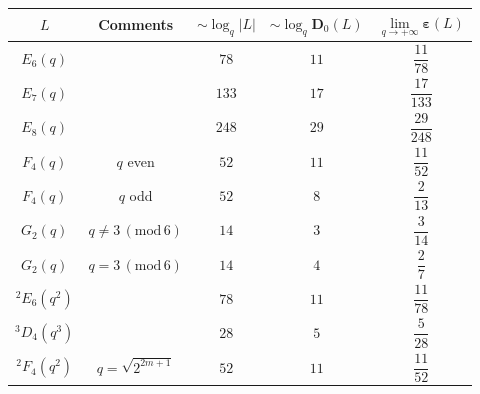 \documentclass{daj}
\theoremstyle{definition}
\theoremstyle{remark}
\newcommand{\D}{\mathbf{D}}
\renewcommand{\a}{\boldsymbol{\varepsilon}}
\begin{document}
{\begin{table}[ht]
\begin{tabular}{| c c | c c c |}
		\phantom{$\dfrac{1^1}{1_{1_1}}$}\hspace{-6mm}
		$L$ & Comments  & $\sim \log_q|L|$ & $\sim \log_q \D_0(L)$ & $\lim \limits_{q \rightarrow+\infty} \a(L)$ \\
		
		\hline \hline
		
		\phantom{$\dfrac{1^1}{1_{1_1}}$}\hspace{-6mm}
		$E_6(q)$ & & $78$ & $11$ & $\dfrac{11}{78}$ \\
		
		\phantom{$\dfrac{1^1}{1_{1_1}}$}\hspace{-6mm}
		$E_7(q)$ & & $133$ & $17$ & $\dfrac{17}{133}$  \\
		
		\phantom{$\dfrac{c1^1}{1_{1_1}}$}\hspace{-6mm}
		$E_8(q)$ & & $248$ & $29$ & $\dfrac{29}{248}$  \\
		
		\phantom{$\dfrac{1^1}{1_{1_1}}$}\hspace{-6mm}
		$F_4(q)$ & $q$ even & $52$ & $11$ & $\dfrac{11}{52}$ \\
		
		\phantom{$\dfrac{1^1}{1_{1_1}}$}\hspace{-6mm}
		$F_4(q)$ & $q$ odd & $52$ & $8$ & $\dfrac{2}{13}$ \\
		
		\phantom{$\dfrac{1^1}{1_{1_1}}$}\hspace{-6mm}
		$G_2(q)$ & $q \ne 3\, (\mathrm{mod}\,6) $ & $14$ & $3$ & $\dfrac{3}{14}$ \\
		
		\phantom{$\dfrac{1^1}{1_{1_1}}$}\hspace{-6mm}
		$G_2(q)$ & $q = 3\, (\mathrm{mod}\,6) $ & $14$ & $4$ & $\dfrac{2}{7}$ \\
		
		\phantom{$\dfrac{1^1}{1_{1_1}}$}\hspace{-6mm}
		$^2E_6(q^2)$ & & $78$ & $11$ & $\dfrac{11}{78}$ \\
		
		\phantom{$\dfrac{1^1}{1_{1_1}}$}\hspace{-6mm}
		$^3D_4(q^3)$ & & $28$ & $5$ & $\dfrac{5}{28}$  \\
		
		\phantom{$\dfrac{1^1}{1_{1_1}}$}\hspace{-6mm}
		$^2F_4(q^2)$ & $q=\sqrt{2^{2m+1}}$ & $52$ & $11$ & $\dfrac{11}{52}$  \\
		

\end{tabular}
\end{table}}
\end{document}

